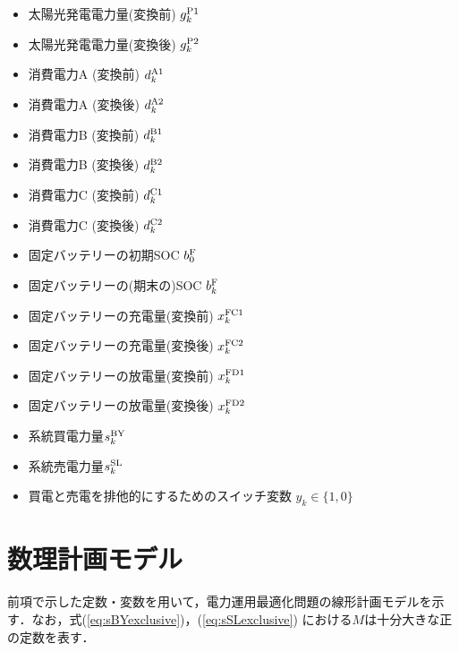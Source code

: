 \documentclass{jarticle}
\newcommand{\IB}{$\bullet$}
\newcommand{\IC}{$\circ$}
\begin{document}
 \begin{itemize}
  \item[\IB] 太陽光発電電力量(変換前) $g^{\rm P1}_{k}$
  \item[\IC] 太陽光発電電力量(変換後) $g^{\rm P2}_{k}$
  \item[\IC] 消費電力A (変換前) $d^{\rm A1}_{k}$
  \item[\IB] 消費電力A (変換後) $d^{\rm A2}_{k}$
  \item[\IC] 消費電力B (変換前) $d^{\rm B1}_{k}$
  \item[\IB] 消費電力B (変換後) $d^{\rm B2}_{k}$
  \item[\IC] 消費電力C (変換前) $d^{\rm C1}_{k}$
  \item[\IB] 消費電力C (変換後) $d^{\rm C2}_{k}$
  \item[\IB] 固定バッテリーの初期SOC $b^{\rm F}_{0}$
  \item[\IC] 固定バッテリーの(期末の)SOC $b^{\rm F}_{k}$
  \item[\IC] 固定バッテリーの充電量(変換前) $x^{\rm FC1}_{k}$
  \item[\IC] 固定バッテリーの充電量(変換後) $x^{\rm FC2}_{k}$
  \item[\IC] 固定バッテリーの放電量(変換前) $x^{\rm FD1}_{k}$
  \item[\IC] 固定バッテリーの放電量(変換後) $x^{\rm FD2}_{k}$ \\[-2.5ex]

  \item[\IC] 系統買電力量$s^{\rm BY}_{k}$
  \item[\IC] 系統売電力量$s^{\rm SL}_{k}$
  
  \item[\IC] 買電と売電を排他的にするためのスイッチ変数 $y_k \in \{1,0\}$
\end{itemize}


\section{数理計画モデル}

前項で示した定数・変数を用いて，電力運用最適化問題の線形計画モデルを示す．なお，式(\ref{eq:sBYexclusive})，(\ref{eq:sSLexclusive})
における$M$は十分大きな正の定数を表す．
%
\end{document}
